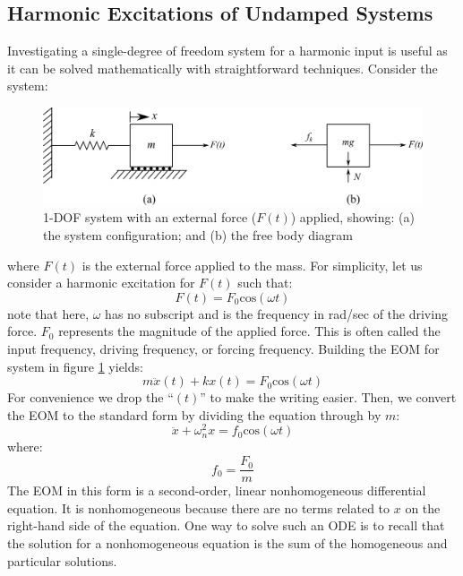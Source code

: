 \documentclass[12pt,letter]{article}
\numberwithin{ex}{section} %
\numberwithin{re}{section} %
\numberwithin{vcs}{section} %
\begin{document}
	
		\subsection{Harmonic Excitations of Undamped Systems}
		
		
			Investigating a single-degree of freedom system for a harmonic input is useful as it can be solved mathematically with straightforward techniques. Consider the system:
			\begin{figure}[H]
				\centering
				\includegraphics[]{../figures/1-DOF-spring_mass_horizontal_forced_FBD.png}
				\caption{1-DOF system with an external force ($F(t)$) applied, showing: (a) the system configuration; and (b) the free body diagram}
				\label{fig:1-DOF-spring_mass_horizontal_forced_FBD}
			\end{figure}	
			\noindent where $F(t)$ is the external force applied to the mass. For simplicity, let us consider a harmonic excitation for $F(t)$ such that:
			\begin{equation}
				F(t) = F_0\text{cos}(\omega t)
			\end{equation}							
			note that here, $\omega$ has no subscript and is the frequency in rad/sec of the driving force. $F_0$ represents the magnitude of the applied force. This is often called the input frequency, driving frequency, or forcing frequency. Building the EOM for system in figure \ref{fig:1-DOF-spring_mass_horizontal_forced_FBD} yields:
			\begin{equation}
				m \ddot{x}(t)+kx(t) = F_0\text{cos}(\omega t)
			\end{equation}			
			For convenience we drop the ``$(t)$'' to make the writing easier. Then, we convert the EOM to the standard form by dividing the equation through by $m$:					
			\begin{equation}
				\ddot{x}+\omega_n^2x = f_0\text{cos}(\omega t)
			\end{equation}					
			where:
			\begin{equation}
				f_0 = \frac{F_0}{m}
			\end{equation}	
			The EOM in this form is a second-order, linear nonhomogeneous differential equation. It is nonhomogeneous because there are no terms related to $x$ on the right-hand side of the equation. One way to solve such an ODE is to recall that the solution for a nonhomogeneous equation is the sum of the homogeneous and particular solutions. 
\end{document}
